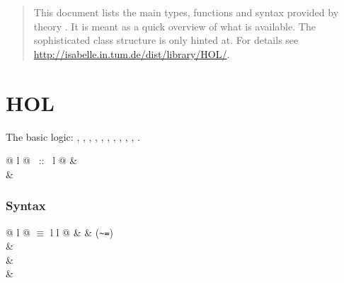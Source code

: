 %
\begin{isabellebody}%
\def\isabellecontext{Main{\isacharunderscore}Doc}%
%
\isadelimtheory
%
\endisadelimtheory
%
\isatagtheory
%
\endisatagtheory
{\isafoldtheory}%
%
\isadelimtheory
%
\endisadelimtheory
%
\isadelimML
%
\endisadelimML
%
\isatagML
%
\endisatagML
{\isafoldML}%
%
\isadelimML
%
\endisadelimML
%
\begin{isamarkuptext}%
\begin{abstract}
This document lists the main types, functions and syntax provided by theory . It is meant as a quick overview of what is available. The sophisticated class structure is only hinted at. For details see \url{http://isabelle.in.tum.de/dist/library/HOL/}.
\end{abstract}

\section{HOL}

The basic logic: , , , , , , , , , , .
\smallskip

\begin{tabular}{@ {} l @ {~::~} l @ {}}
 & \\
 & \\
\end{tabular}

\subsubsection*{Syntax}

\begin{supertabular}{@ {} l @ {\quad$\equiv$\quad} l l @ {}}
 &  & (\verb$~=$)\\
 &  \\
 & \\
 & \\
\end{supertabular}



\end{isamarkuptext}
\end{isabellebody}
